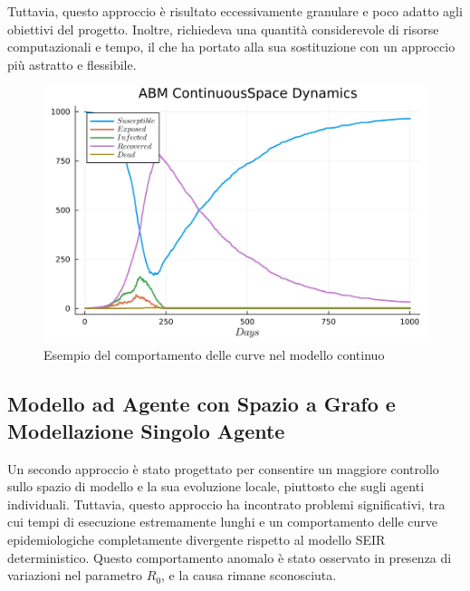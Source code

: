 Tuttavia, questo approccio è risultato eccessivamente granulare e 
poco adatto agli obiettivi del progetto. Inoltre, richiedeva una 
quantità considerevole di risorse computazionali e tempo, il che 
ha portato alla sua sostituzione con un approccio più astratto e flessibile.

\begin{figure}[H]
	\begin{center}
		\includegraphics[width=\textwidth]{img/plot_abm_continuousspace.jpg}
        \caption{Esempio del comportamento delle curve nel modello continuo}
		\label{fig:seir_curve_continuous}
    \end{center}
\end{figure}

\newpage

\subsection{Modello ad Agente con Spazio a Grafo e Modellazione Singolo Agente}

Un secondo approccio è stato progettato per consentire un maggiore 
controllo sullo spazio di modello e la sua evoluzione locale, 
piuttosto che sugli agenti individuali. Tuttavia, questo approccio 
ha incontrato problemi significativi, tra cui tempi di esecuzione 
estremamente lunghi e un comportamento delle curve epidemiologiche 
completamente divergente rispetto al modello SEIR deterministico. 
Questo comportamento anomalo è stato osservato in presenza di variazioni 
nel parametro $R_0$, e la causa rimane sconosciuta.

